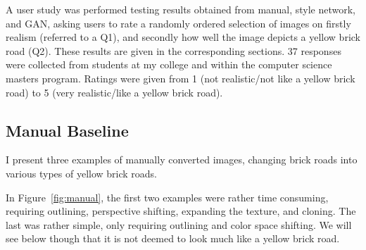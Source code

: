 \documentclass[10pt,twocolumn,letterpaper]{article}
\begin{document}
A user study was performed testing results obtained from manual, style network, and GAN, asking users to rate a randomly ordered selection of images on firstly realism (referred to a Q1), and secondly how well the image depicts a yellow brick road (Q2). These results are given in the corresponding sections. 37 responses were collected from students at my college and within the computer science masters program. Ratings were given from 1 (not realistic/not like a yellow brick road) to 5 (very realistic/like a yellow brick road).

\subsection{Manual Baseline}
\label{sec:manual}
I present three examples of manually converted images, changing brick roads into various types of yellow brick roads.

In Figure~\ref{fig:manual}, the first two examples were rather time consuming, requiring outlining, perspective shifting, expanding the texture, and cloning. The last was rather simple, only requiring outlining and color space shifting. We will see below though that it is not deemed to look much like a yellow brick road.
\end{document}
